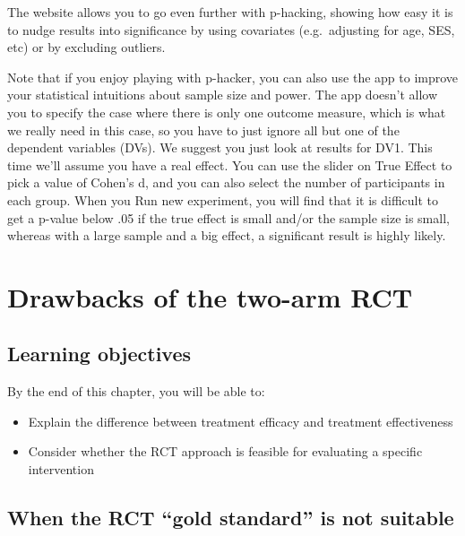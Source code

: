 \documentclass{krantz}
\begin{document}
The website allows you to go even further with p-hacking, showing how easy it is to nudge results into significance by using covariates (e.g.~adjusting for age, SES, etc) or by excluding outliers.

Note that if you enjoy playing with p-hacker, you can also use the app to improve your statistical intuitions about sample size and power. The app doesn't allow you to specify the case where there is only one outcome measure, which is what we really need in this case, so you have to just ignore all but one of the dependent variables (DVs). We suggest you just look at results for DV1. This time we'll assume you have a real effect. You can use the slider on True Effect to pick a value of Cohen's d, and you can also select the number of participants in each group. When you Run new experiment, you will find that it is difficult to get a p-value below .05 if the true effect is small and/or the sample size is small, whereas with a large sample and a big effect, a significant result is highly likely.

\hypertarget{drawbacks}{%
\chapter{Drawbacks of the two-arm RCT}\label{drawbacks}}

\hypertarget{learning-objectives-13}{%
\section{Learning objectives}\label{learning-objectives-13}}

By the end of this chapter, you will be able to:

\begin{itemize}
\item
  Explain the difference between treatment efficacy and treatment effectiveness
\item
  Consider whether the RCT approach is feasible for evaluating a specific intervention
\end{itemize}

\hypertarget{when-the-rct-gold-standard-is-not-suitable}{%
\section{When the RCT ``gold standard'' is not suitable}\label{when-the-rct-gold-standard-is-not-suitable}}
\end{document}
